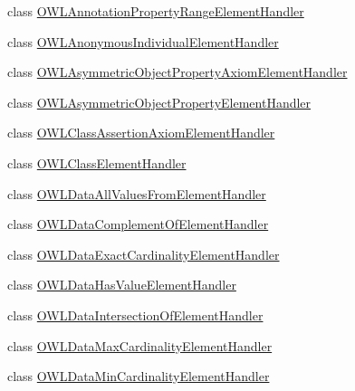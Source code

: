 \begin{DoxyCompactItemize}
\item 
class \hyperlink{classorg_1_1coode_1_1owlapi_1_1owlxmlparser_1_1_o_w_l_annotation_property_range_element_handler}{O\-W\-L\-Annotation\-Property\-Range\-Element\-Handler}
\item 
class \hyperlink{classorg_1_1coode_1_1owlapi_1_1owlxmlparser_1_1_o_w_l_anonymous_individual_element_handler}{O\-W\-L\-Anonymous\-Individual\-Element\-Handler}
\item 
class \hyperlink{classorg_1_1coode_1_1owlapi_1_1owlxmlparser_1_1_o_w_l_asymmetric_object_property_axiom_element_handler}{O\-W\-L\-Asymmetric\-Object\-Property\-Axiom\-Element\-Handler}
\item 
class \hyperlink{classorg_1_1coode_1_1owlapi_1_1owlxmlparser_1_1_o_w_l_asymmetric_object_property_element_handler}{O\-W\-L\-Asymmetric\-Object\-Property\-Element\-Handler}
\item 
class \hyperlink{classorg_1_1coode_1_1owlapi_1_1owlxmlparser_1_1_o_w_l_class_assertion_axiom_element_handler}{O\-W\-L\-Class\-Assertion\-Axiom\-Element\-Handler}
\item 
class \hyperlink{classorg_1_1coode_1_1owlapi_1_1owlxmlparser_1_1_o_w_l_class_element_handler}{O\-W\-L\-Class\-Element\-Handler}
\item 
class \hyperlink{classorg_1_1coode_1_1owlapi_1_1owlxmlparser_1_1_o_w_l_data_all_values_from_element_handler}{O\-W\-L\-Data\-All\-Values\-From\-Element\-Handler}
\item 
class \hyperlink{classorg_1_1coode_1_1owlapi_1_1owlxmlparser_1_1_o_w_l_data_complement_of_element_handler}{O\-W\-L\-Data\-Complement\-Of\-Element\-Handler}
\item 
class \hyperlink{classorg_1_1coode_1_1owlapi_1_1owlxmlparser_1_1_o_w_l_data_exact_cardinality_element_handler}{O\-W\-L\-Data\-Exact\-Cardinality\-Element\-Handler}
\item 
class \hyperlink{classorg_1_1coode_1_1owlapi_1_1owlxmlparser_1_1_o_w_l_data_has_value_element_handler}{O\-W\-L\-Data\-Has\-Value\-Element\-Handler}
\item 
class \hyperlink{classorg_1_1coode_1_1owlapi_1_1owlxmlparser_1_1_o_w_l_data_intersection_of_element_handler}{O\-W\-L\-Data\-Intersection\-Of\-Element\-Handler}
\item 
class \hyperlink{classorg_1_1coode_1_1owlapi_1_1owlxmlparser_1_1_o_w_l_data_max_cardinality_element_handler}{O\-W\-L\-Data\-Max\-Cardinality\-Element\-Handler}
\item 
class \hyperlink{classorg_1_1coode_1_1owlapi_1_1owlxmlparser_1_1_o_w_l_data_min_cardinality_element_handler}{O\-W\-L\-Data\-Min\-Cardinality\-Element\-Handler}

\end{DoxyCompactItemize}
